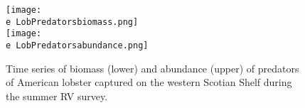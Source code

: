 \documentclass[11pt]{article}
\newcommand{\e}{/backup/bio_data/bio.lobster/figures/} %
\begin{document}

\begin{figure}
\centering
    \texttt{[image: \\e LobPredatorsbiomass.png]}\\
    \texttt{[image: \\e LobPredatorsabundance.png]}\\
    \caption{Time series of biomass (lower) and abundance (upper) of predators of American lobster captured on the western Scotian Shelf during the summer RV survey.}

\end{figure}
\end{document}

